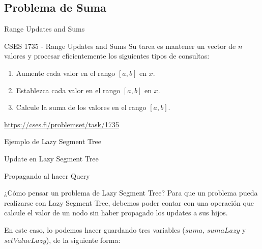 \documentclass{beamer}
\begin{document}
\subsection{Problema de Suma}
\begin{frame}{Range Updates and Sums}
\begin{block}{CSES 1735 - Range Updates and Sums}
Su tarea es mantener un vector de $n$ valores y procesar eficientemente los siguientes tipos de consultas:
\begin{enumerate}
    \item Aumente cada valor en el rango $[a,b]$ en $x$.
    \item Establezca cada valor en el rango $[a,b]$ en $x$.
    \item Calcule la suma de los valores en el rango $[a,b]$.
\end{enumerate}
\end{block}

\url{https://cses.fi/problemset/task/1735}
\end{frame}

\begin{frame}{Ejemplo de Lazy Segment Tree}

\end{frame}

\begin{frame}{Update en Lazy Segment Tree}

\end{frame}

\begin{frame}{Propagando al hacer Query}

\end{frame}

\begin{frame}{¿Cómo pensar un problema de Lazy Segment Tree?}
Para que un problema pueda realizarse con Lazy Segment Tree, debemos poder contar con una operación que calcule el valor de un nodo sin haber propagado los updates a sus hijos.

En este caso, lo podemos hacer guardando tres variables ($suma$, $sumaLazy$ y $setValueLazy$), de la siguiente forma:
\end{frame}
\end{document}
